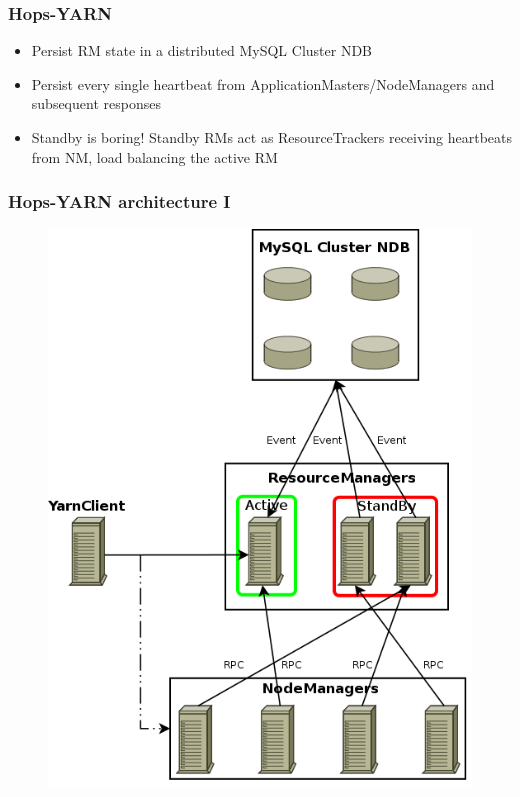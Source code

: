 \documentclass{beamer}
\begin{document}
\begin{frame}
\frametitle{Hops-YARN}

\begin{itemize}
\item Persist RM state in a distributed MySQL Cluster NDB

\item Persist every single heartbeat from
  ApplicationMasters/NodeManagers and subsequent responses

\item<2-> Standby is boring! Standby RMs act as ResourceTrackers
  receiving heartbeats from NM, load balancing the active RM
\end{itemize}
\end{frame}

\begin{frame}
\frametitle{Hops-YARN architecture I}

\begin{figure}
\centering
\includegraphics[scale=0.3]{resources/hopsyarn_arch_overview.png}
\end{figure}
\end{frame}
\end{document}
